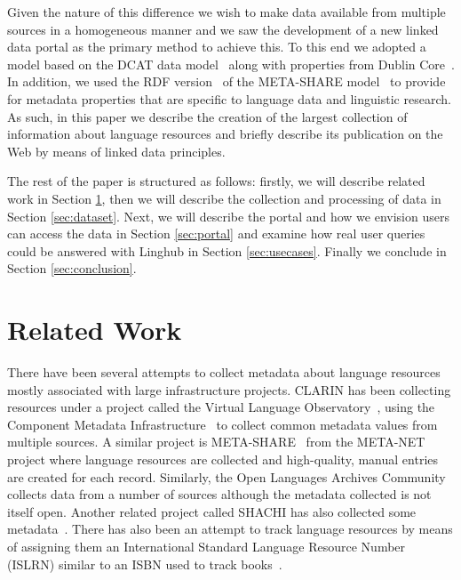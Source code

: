 \documentclass{acm_proc_article-sp}
\begin{document}
Given the nature of this difference we wish to make data available from multiple
sources in a homogeneous manner and we saw the development of a new linked data
portal as the primary method to achieve this. To this end we adopted a model based on the
DCAT data model~\cite{maali2014data} along with properties from Dublin
Core~\cite{weibel1998dublin}. In addition, we used the RDF
version~\cite{mccrae2015ontology} of the META-SHARE
model~\cite{gavrilidou2012meta} to provide for metadata properties that are
specific to language data and linguistic research. As such, in this paper we
describe the creation of the largest collection of information about language
resources and briefly describe its publication on the Web by means of linked
data principles.

The rest of the paper is structured as follows: firstly, we will describe
related work in Section \ref{sec:related}, then we will describe the collection
and processing of data in Section \ref{sec:dataset}. Next, we will describe the
portal and how we envision users can access the data in Section \ref{sec:portal}
and examine how real user queries could be answered with Linghub in Section
\ref{sec:usecases}. Finally we conclude in Section \ref{sec:conclusion}.

\section{Related Work}
\label{sec:related}

There have been several attempts to collect metadata about language resources
mostly associated with large infrastructure projects. CLARIN has been collecting
resources under a project called the Virtual Language
Observatory~\cite{van2012semantic}, using the Component
Metadata Infrastructure~\cite[CMDI]{broeder2012cmdi} to collect common metadata
values from multiple sources. A similar project is
META-SHARE~\cite{piperidis2012meta} from the META-NET project where language
resources are collected and high-quality, manual entries are created for each
record. Similarly, the Open Languages Archives
Community~\cite[OLAC]{bird2003extending} collects data from a number of sources
although the metadata collected is not itself open. Another related project called
SHACHI has also collected some metadata~\cite{tohyama2008shachi}. There has also
been an attempt to track language resources by means of assigning them an
International Standard Language Resource Number (ISLRN) similar to an ISBN used
to track books~\cite{choukri2012using}.
\end{document}
